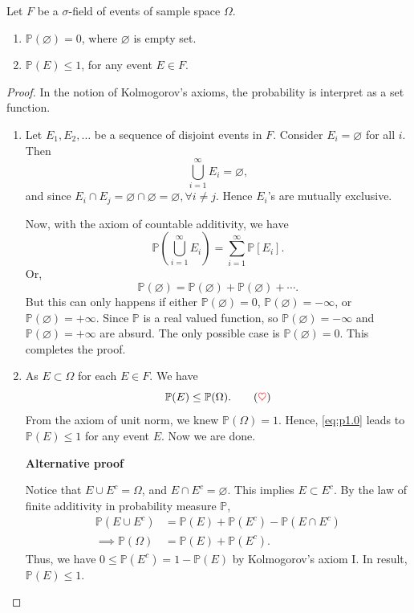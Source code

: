 \begin{theorem}
    Let $F$ be a $\sigma$-field of events of sample space $\Omega$.
    \begin{enumerate}
        \item $\mathbb{P}(\varnothing) = 0$, where $\varnothing$ is empty set.
        \item $\mathbb{P}(E) \leq 1$, for any event $E \in F$. 
    \end{enumerate} 
\end{theorem}
\begin{proof}
    In the notion of Kolmogorov's axioms, the probability is interpret as a set function.
    \begin{enumerate}
        \item Let $E_1, E_2, \ldots$ be a sequence of disjoint events in $F$. Consider 
        $E_i = \varnothing$ for all $i$. Then 
        \[
            \bigcup^\infty_{i=1} E_i = \varnothing,
        \]
        and since $E_i \cap E_j = \varnothing \cap \varnothing =\varnothing, \forall i \neq j$. Hence 
        $E_i$'s are mutually exclusive.

        Now, with the axiom of countable additivity, we have
        \[
            \mathbb{P} \left( \bigcup^{\infty}_{i=1} E_i \right) = \sum^\infty_{i=1} \mathbb{P}[E_i].
        \]
        Or,
        \[
            \mathbb{P}(\varnothing) = \mathbb{P}(\varnothing) + \mathbb{P}(\varnothing) + \cdots.
        \]
        But this can only happens if either $\mathbb{P}(\varnothing) = 0$, $\mathbb{P}(\varnothing) = -\infty$, or 
        $\mathbb{P}(\varnothing) = +\infty$. Since $\mathbb{P}$ is a real valued function, so 
        $\mathbb{P}(\varnothing) = -\infty$ and $\mathbb{P}(\varnothing) = +\infty$ are absurd. 
        The only possible case is $\mathbb{P}(\varnothing) = 0$. This completes the proof.

        \item As $E \subset \Omega$ for each $E \in F$. We have 
        \[
            \mathbb{P}(E) \leq \mathbb{P}(\Omega). \label{eq:p1.0} \tag{{\color{red} $\heartsuit $}}
        \]
        From the axiom of unit norm, we knew $\mathbb{P}(\Omega) = 1$. Hence, \eqref{eq:p1.0} leads to
        $\mathbb{P}(E) \leq 1$ for any event $E$. Now we are done.

        \vspace{1.45cm}
        \textbf{Alternative proof}
        
        Notice that $E \cup E^c = \Omega$, and $E \cap E^c = \varnothing$.
        This implies $E \subset E^c$. By the law of finite additivity in probability measure $\mathbb{P}$,
        \begin{align*}
            \mathbb{P}(E \cup E^c) &= \mathbb{P}(E) + \mathbb{P}(E^c) - \mathbb{P}(E \cap E^c)\\
            \implies \mathbb{P}(\Omega) &= \mathbb{P}(E) + \mathbb{P}(E^c).
        \end{align*}
        Thus, we have $0 \leq \mathbb{P}(E^c) = 1 - \mathbb{P}(E)$ by Kolmogorov's axiom I. In result, 
        $\mathbb{P}(E) \leq 1$.
    \end{enumerate}
\end{proof}

